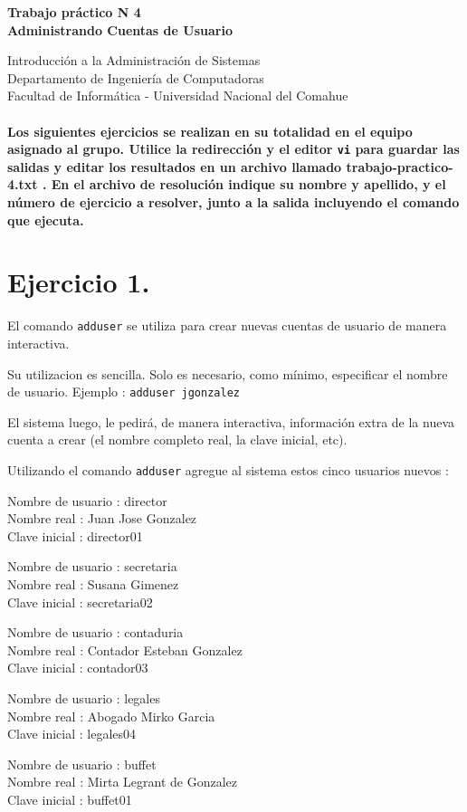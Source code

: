 \documentclass[12pt]{article}
\def\maketitle{

 \makeatletter
 {\color{bl} \centering \huge \sc \textbf{
Trabajo práctico N 4 \\
\large \vspace*{-8pt} \color{black} Administrando Cuentas de Usuario
 \vspace*{8pt} }\par}
 \makeatother


 \makeatletter
 {\centering \small 
	Introducción a la Administración de Sistemas \\
 	Departamento de Ingeniería de Computadoras \\
 	Facultad de Informática - Universidad Nacional del Comahue \\
 	\vspace{20pt} }
 \makeatother

}
\begin{document}
\thispagestyle{empty}
\maketitle
\setlength{\parindent}{0pt}

\paragraph{Los siguientes ejercicios se realizan en su totalidad en el equipo asignado al grupo.
Utilice la redirección y el editor \texttt{vi} para guardar las salidas y editar los resultados 
en un archivo llamado trabajo-practico-4.txt . En el archivo de resolución indique su nombre y apellido, y el número de ejercicio a resolver, junto a la salida incluyendo el comando que ejecuta. }

\section{Ejercicio 1.}


El comando  \texttt{adduser} se utiliza para crear nuevas cuentas de usuario de manera interactiva.

Su utilizacion es sencilla. Solo es necesario, como mínimo, especificar el nombre de usuario. Ejemplo : \texttt{adduser jgonzalez}

El sistema luego, le pedirá, de manera interactiva, información extra de la nueva cuenta a crear (el nombre completo real, la clave inicial, etc).

Utilizando el comando \texttt{adduser} agregue al sistema estos cinco usuarios nuevos :

Nombre de usuario : director \\
Nombre real : Juan Jose Gonzalez \\
Clave inicial : director01

Nombre de usuario : secretaria \\
Nombre real : Susana Gimenez \\
Clave inicial : secretaria02

Nombre de usuario : contaduria \\
Nombre real : Contador Esteban Gonzalez \\
Clave inicial : contador03

Nombre de usuario : legales \\
Nombre real : Abogado Mirko Garcia  \\
Clave inicial : legales04

Nombre de usuario : buffet \\
Nombre real : Mirta Legrant de Gonzalez \\
Clave inicial : buffet01
\end{document}
